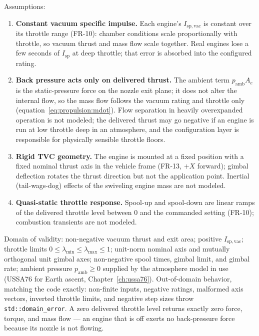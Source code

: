 Assumptions:
\begin{enumerate}
  \item \textbf{Constant vacuum specific impulse.} Each engine's
    $I_{\mathrm{sp,vac}}$ is constant over its throttle range (FR-10):
    chamber conditions scale proportionally with throttle, so vacuum
    thrust and mass flow scale together. Real engines lose a few
    seconds of $I_{\mathrm{sp}}$ at deep throttle; that error is
    absorbed into the configured rating.
  \item \textbf{Back pressure acts only on delivered thrust.} The
    ambient term $p_{\mathrm{amb}} A_e$ is the static-pressure force on
    the nozzle exit plane; it does not alter the internal flow, so the
    mass flow follows the vacuum rating and throttle only
    (equation~\eqref{eq:propulsion:mdot}). Flow separation in heavily
    overexpanded operation is not modeled; the delivered thrust may go
    negative if an engine is run at low throttle deep in an atmosphere,
    and the configuration layer is responsible for physically sensible
    throttle floors.
  \item \textbf{Rigid TVC geometry.} The engine is mounted at a fixed
    position with a fixed nominal thrust axis in the vehicle frame
    (FR-13, $+X$ forward); gimbal deflection rotates the thrust
    direction but not the application point. Inertial (tail-wags-dog)
    effects of the swiveling engine mass are not modeled.
  \item \textbf{Quasi-static throttle response.} Spool-up and spool-down
    are linear ramps of the delivered throttle level between 0 and the
    commanded setting (FR-10); combustion transients are not modeled.
\end{enumerate}

Domain of validity: non-negative vacuum thrust and exit area; positive
$I_{\mathrm{sp,vac}}$; throttle limits
$0 \le \lambda_{\min} \le \lambda_{\max} \le 1$; unit-norm nominal axis
and mutually orthogonal unit gimbal axes; non-negative spool times,
gimbal limit, and gimbal rate; ambient pressure $p_{\mathrm{amb}} \ge 0$
supplied by the atmosphere model in use (USSA76 for Earth ascent,
Chapter~\ref{ch:ussa76}). Out-of-domain behavior, matching the code
exactly: non-finite inputs, negative ratings, malformed axis vectors,
inverted throttle limits, and negative step sizes throw
\texttt{std::domain\_error}. A zero delivered throttle level returns
exactly zero force, torque, and mass flow --- an engine that is off
exerts no back-pressure force because its nozzle is not flowing.

